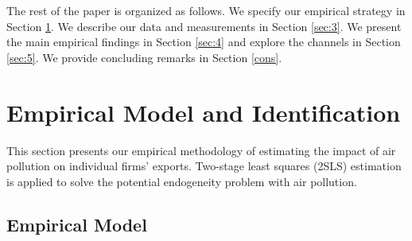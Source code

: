 \documentclass[12pt]{article}
\begin{document}
The rest of the paper is organized as follows. We specify our empirical
strategy in Section \ref{sec:empirical_strategy}. We describe our data and measurements in Section \ref{sec:3}.
We present the main empirical findings in Section \ref{sec:4} and explore the
channels in Section \ref{sec:5}. We provide concluding remarks in Section \ref{cons}.

\section{Empirical Model and Identification}

\label{sec:empirical_strategy} This section presents our empirical
methodology of estimating the impact of air pollution on individual firms'
exports. Two-stage
least squares (2SLS)
estimation is applied to solve the potential endogeneity problem with
air pollution.

\subsection{Empirical Model}
\end{document}
